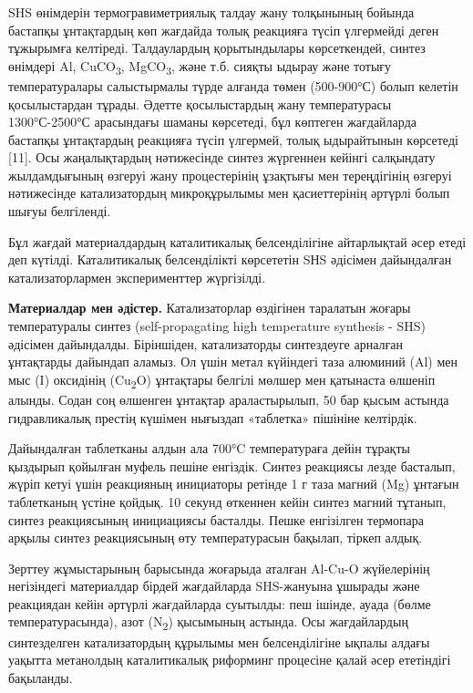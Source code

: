 SHS өнімдерін термогравиметриялық талдау жану толқынының бойында
бастапқы ұнтақтардың көп жағдайда толық реакцияға түсіп үлгермейді деген
тұжырымға келтіреді. Талдаулардың қорытындылары көрсеткендей, синтез
өнімдері Al, CuCO\textsubscript{3}, MgCO\textsubscript{3}, және т.б.
сияқты ыдырау және тотығу температуралары салыстырмалы түрде алғанда
төмен (500-900°С) болып келетін қосылыстардан тұрады. Әдетте
қосылыстардың жану температурасы 1300°С-2500°С арасындағы шаманы
көрсетеді, бұл көптеген жағдайларда бастапқы ұнтақтардың реакцияға түсіп
үлгермей, толық ыдырайтынын көрсетеді {[}11{]}. Осы жаңалықтардың
нәтижесінде синтез жүргеннен кейінгі салқындату жылдамдығының өзгеруі
жану процестерінің ұзақтығы мен тереңдігінің өзгеруі нәтижесінде
катализатордың микроқұрылымы мен қасиеттерінің әртүрлі болып шығуы
белгіленді.

Бұл жағдай материалдардың каталитикалық белсенділігіне айтарлықтай әсер
етеді деп күтілді. Каталитикалық белсенділікті көрсететін SНS әдісімен
дайындалған катализаторлармен эксперименттер жүргізілді.

{\bfseries Материалдар мен әдістер.} Катализаторлар өздігінен таралатын
жоғары температуралы синтез (self-propagating high temperature synthesis
- SHS) әдісімен дайындалды. Біріншіден, катализаторды синтездеуге
арналған ұнтақтарды дайындап аламыз. Ол үшін метал күйіндегі таза
алюминий (Al) мен мыс (I) оксидінің (Cu\textsubscript{2}O) ұнтақтары
белгілі мөлшер мен қатынаста өлшеніп алынды. Содан соң өлшенген ұнтақтар
араластырылып, 50 бар қысым астында гидравликалық престің күшімен
нығыздап «таблетка» пішініне келтірдік.

Дайындалған таблетканы алдын ала 700°C температураға дейін тұрақты
қыздырып қойылған муфель пешіне енгіздік. Синтез реакциясы лезде
басталып, жүріп кетуі үшін реакцияның инициаторы ретінде 1 г таза магний
(Mg) ұнтағын таблетканың үстіне қойдық. 10 секунд өткеннен кейін синтез
магний тұтанып, синтез реакциясының инициациясы басталды. Пешке
енгізілген термопара арқылы синтез реакциясының өту температурасын
бақылап, тіркеп алдық.

Зерттеу жұмыстарының барысында жоғарыда аталған Al-Cu-O жүйелерінің
негізіндегі материалдар бірдей жағдайларда SHS-жануына ұшырады және
реакциядан кейін әртүрлі жағдайларда суытылды: пеш ішінде, ауада (бөлме
температурасында), азот (N\textsubscript{2}) қысымының астында. Осы
жағдайлардың синтезделген катализатордың құрылымы мен белсенділігіне
ықпалы алдағы уақытта метанолдың каталитикалық риформинг процесіне қалай
әсер ететіндігі бақыланды.

